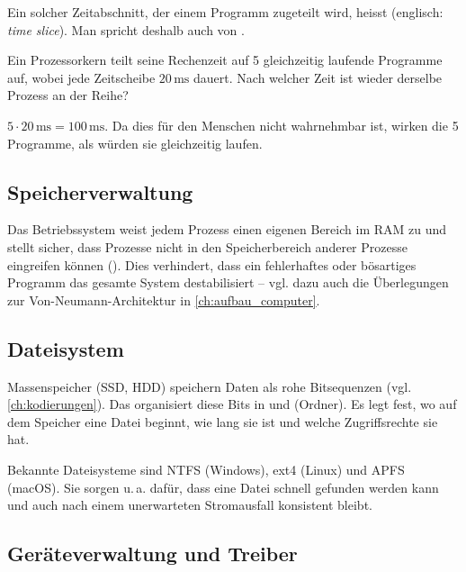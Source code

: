 Ein solcher Zeitabschnitt, der einem Programm zugeteilt wird, heisst  (englisch: \emph{time slice}). Man spricht deshalb auch von .

\begin{myexercise}
    Ein Prozessorkern teilt seine Rechenzeit auf 5 gleichzeitig laufende Programme auf, wobei jede Zeitscheibe $20\,\mathrm{ms}$ dauert. Nach welcher Zeit ist wieder derselbe Prozess an der Reihe?
    \begin{myanswer}
        $5 \cdot 20\,\mathrm{ms} = 100\,\mathrm{ms}$. Da dies für den Menschen nicht wahrnehmbar ist, wirken die 5 Programme, als würden sie gleichzeitig laufen.
    \end{myanswer}
\end{myexercise}

\subsection{Speicherverwaltung}

Das Betriebssystem weist jedem Prozess einen eigenen Bereich im RAM zu und stellt sicher, dass Prozesse nicht in den Speicherbereich anderer Prozesse eingreifen können (). Dies verhindert, dass ein fehlerhaftes oder bösartiges Programm das gesamte System destabilisiert -- vgl. dazu auch die Überlegungen zur Von-Neumann-Architektur in \cref{ch:aufbau_computer}.

\subsection{Dateisystem}

Massenspeicher (SSD, HDD) speichern Daten als rohe Bitsequenzen (vgl. \cref{ch:kodierungen}). Das  organisiert diese Bits in  und  (Ordner). Es legt fest, wo auf dem Speicher eine Datei beginnt, wie lang sie ist und welche Zugriffsrechte sie hat.

\begin{myexample}[Dateisysteme]
    Bekannte Dateisysteme sind NTFS (Windows), ext4 (Linux) und APFS (macOS). Sie sorgen u.\,a. dafür, dass eine Datei schnell gefunden werden kann und auch nach einem unerwarteten Stromausfall konsistent bleibt.
\end{myexample}

\subsection{Geräteverwaltung und Treiber}


